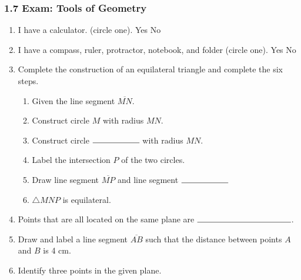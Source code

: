 \documentclass[12pt, twoside]{article}
\begin{document}
  \subsubsection*{1.7 Exam: Tools of Geometry}
    \vspace{0.5cm}
    \begin{enumerate}
      \item I have a calculator. (circle one). Yes \qquad No
      \item I have a compass, ruler, protractor, notebook, and folder (circle one). Yes \qquad No
\vspace{0.5cm}
      \item Complete the construction of an equilateral triangle and complete the six steps.
      \begin{enumerate}
        \item Given the line segment $\overline{MN}$.
        \bigskip
        \item Construct circle $M$ with radius $MN$.
        \bigskip
        \item Construct circle $\rule{2cm}{0.15mm}$  with radius $MN$. \bigskip
        \item Label the intersection $P$ of the two circles.
        \bigskip
        \item Draw line segment $\overline{MP}$ and line segment $\rule{2cm}{0.15mm}$
        \bigskip
        \item $\triangle MNP$ is equilateral.
      \end{enumerate}
      \vspace{7cm}
      \begin{center}
      \end{center}

    \newpage

      \item Points that are all located on the same plane are $\rule{4cm}{0.15mm}$.\bigskip


      \item Draw and label a line segment $\overline{AB}$ such that the distance between points $A$ and $B$ is 4 cm. 
      \vspace{3cm}


      \item Identify three points in the given plane.\\[0.25in]
         \vspace{1cm}



\end{enumerate}
\end{document}
